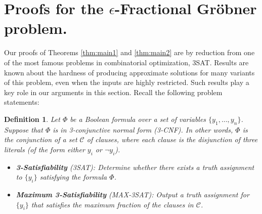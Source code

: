 \documentclass{article}
\newcommand{\C}[0]{\mathcal{C}}
\newcommand{\ep}[0]{\epsilon}
\newtheorem{defn}[thm]{Definition}
\begin{document}
\section{Proofs for the $\ep$\nobreakdash-Fractional Gr\"obner problem.}
\label{sec:fractional}

Our proofs of Theorems \ref{thm:main1} and \ref{thm:main2} are by reduction from one of the most famous problems in combinatorial optimization, 3SAT. Results are known about the hardness of producing approximate solutions for many variants of this problem, even when the inputs are highly restricted. Such results play a key role in our arguments in this section. Recall the following problem statements:

\begin{defn}
Let $\Phi$ be a Boolean formula over a set of variables $\{y_1,\ldots,y_n\}$.  Suppose that $\Phi$ is in 3\nobreakdash-conjunctive normal form (3\nobreakdash-CNF). In other words, $\Phi$ is the conjunction of a set $\C$ of clauses, where each clause is the disjunction of three literals (of the form either $y_i$ or $\neg y_i$).  

\begin{itemize}
\item \textbf{3\nobreakdash-Satisfiability} (3SAT): Determine whether there exists a truth assignment to $\{y_i\}$ satisfying the formula $\Phi$.

\item \textbf{Maximum 3\nobreakdash-Satisfiability} (MAX-3SAT): Output a truth assignment for $\{y_i\}$ that satisfies the maximum fraction of the clauses in $\C$.
\end{itemize}
\end{defn}
\end{document}
